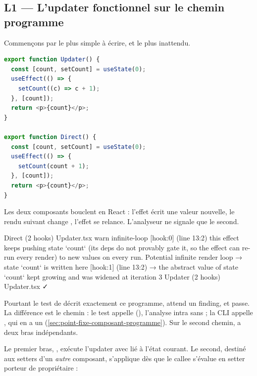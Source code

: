 \subsection{L1 --- L'updater fonctionnel sur le chemin programme}
\label{sec:limites-perspectives-updater}

Commençons par le plus simple à écrire, et le plus inattendu.

\begin{lstlisting}[language=TypeScript,caption={\file{/tmp/r27/updater/Updater.tsx} : la même boucle, deux écritures},label={lst:limites-updater}]
export function Updater() {
  const [count, setCount] = useState(0);
  useEffect(() => {
    setCount((c) => c + 1);
  }, [count]);
  return <p>{count}</p>;
}

export function Direct() {
  const [count, setCount] = useState(0);
  useEffect(() => {
    setCount(count + 1);
  }, [count]);
  return <p>{count}</p>;
}
\end{lstlisting}

Les deux composants bouclent en React : l'effet écrit une valeur nouvelle, le rendu suivant change , l'effet se relance. L'analyseur ne signale que le second.

\begin{sortie}
  Direct  (2 hooks)  Updater.tsx
    warn   infinite-loop  [hook:0]  (line 13:2)  this effect keeps pushing state `count` (its deps do not provably gate it, so the effect can re-run every render) to new values on every run. Potential infinite render loop
       → state `count` is written here [hook:1] (line 13:2)
       → the abstract value of state `count` kept growing and was widened at iteration 3
  Updater  (2 hooks)  Updater.tsx  ✓
\end{sortie}

Pourtant le test de  décrit exactement ce programme, attend un finding, et passe. La différence est le chemin : le test appelle  (), l'analyse intra sans  ; la CLI appelle , qui en a un (\cref{sec:point-fixe-composant-programme}). Sur le second chemin,  a deux bras indépendants.

Le premier bras, , exécute l'updater avec  lié à l'état courant. Le second, destiné aux setters d'un \emph{autre} composant, s'applique dès que le callee s'évalue en setter porteur de propriétaire :

